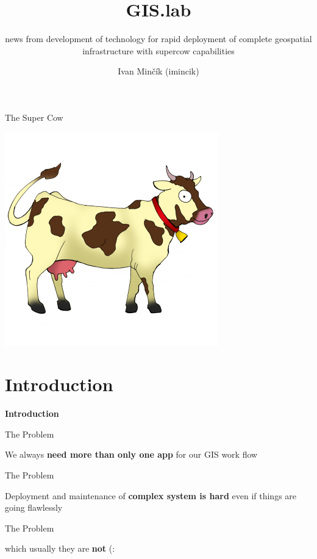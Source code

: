 \documentclass[12pt]{beamer}
\title{GIS.lab}
\subtitle{news from development of technology for rapid deployment of complete geospatial infrastructure with supercow capabilities}
\author{Ivan Minčík (imincik)}
\institute{FOSS4G Europe 2015, Como}
\date{}
\begin{document}
\begin{frame}
	\titlepage
\end{frame}

\begin{frame}{The Super Cow}
	\begin{center}
		\includegraphics[keepaspectratio=true,height=0.6\textheight]{images/cow.png}
	\end{center}
\end{frame}


\section{Introduction}
\begin{frame}
	\begin{center}
		\LARGE\textbf{Introduction}	
	\end{center}
\end{frame}

\begin{frame}{The Problem}
	\begin{center}
		We always \textbf{need more than only one app} for our GIS work flow
	\end{center}
\end{frame}

\begin{frame}{The Problem}
	\begin{center}
		Deployment and maintenance of \textbf{complex system is hard} even if things are going flawlessly
		\end{center}
\end{frame}

\begin{frame}{The Problem}
	\begin{center}
		which usually they are \textbf{not} (:
	\end{center}
\end{frame}
\end{document}
